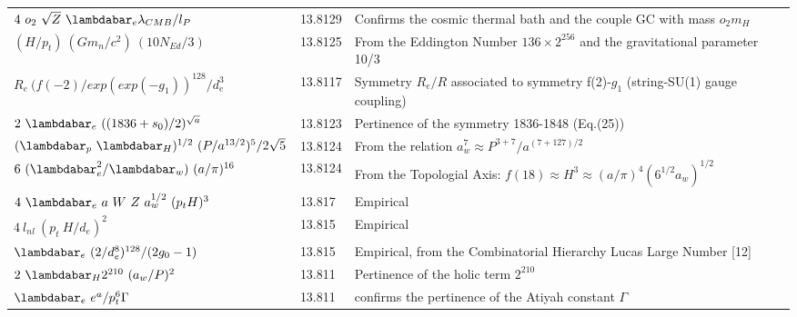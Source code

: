 \documentclass[a4paper,9pt]{article}
\begin{document}
\begin{table}
\begin{tabular}{lll}
 
 
 
 
 $4~o_2~\sqrt Z~ \lambdabar_{e}\lambda_{CMB}/l_P     $  & 13.8129    &Confirms the cosmic thermal bath and the couple GC with mass $o_2 m_H$    \\
 
 
 
 
 $ (H/p_t)~(Gm_n/c^2) ~(10N_{Ed}/3)$ & 13.8125 & From the Eddington Number $136 \times 2^{256}$ and the gravitational parameter 10/3 \cite{Sanchez3}  \\
 
 
 $ R_e ~({f(-2)}/exp(exp(-g_1))^{128}/d_e^3$  & 13.8117    & Symmetry $R_e/R$ associated to symmetry f(2)-$g_1$  (string-SU(1) gauge coupling)     \\
 
 
 
 



 $ 2~\lambdabar_{e} ~((1836+s_0)/2)^{\sqrt a} $  & 13.8123 & Pertinence of the symmetry 1836-1848 (Eq.(25))\\

  
  $ (\lambdabar_{p}~ \lambdabar_{H})^{1/2} ~(P/a^{13/2})^5/2\sqrt 5 $  & 13.8124 & From the relation $a_w^7 \approx P^{3+7}/a^{(7 + 127)/2}$ \cite{Sanchez3}\\
 
  
  $6~(\lambdabar_{e}^2/\lambdabar_w)~(a/\pi)^{16}$  & 13.8124    & From the Topologial Axis: $f(18)\approx H^3 \approx (a/\pi)^4 (6^{1/2}a_w)^{1/2}$  \\
  
  
  
   
  $4~\lambdabar_e~a~ W~Z~ a_w^{1/2}~ (p_tH)^3$  & 13.817    & Empirical \\
  
  $4~l_{nl}~ (p_t~H/d_e)^2$  & 13.815    & Empirical \\
  
 $\lambdabar_e ~(2/d_e^8)^{128}/(2g_0-1)$  & 13.815    &  Empirical, from the Combinatorial Hierarchy Lucas Large Number [12] \\ 
  
  
  $ 2~\lambdabar_{H}2^{210} ~(a_w/P)^2  $ & 13.811 & Pertinence of the holic term $2^{210}$ \\
  
  $ \lambdabar_e ~e^a/p_t^6\Gamma$ & 13.811 & confirms the pertinence of the Atiyah constant $\Gamma$  \\
  

\end{tabular}
\end{table}
\end{document}
